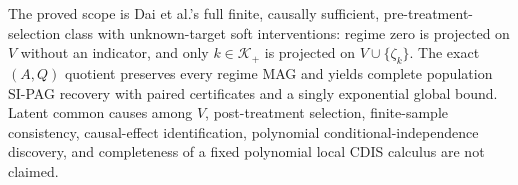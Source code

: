 The proved scope is Dai et al.'s full finite, causally sufficient, pre-treatment-selection class with unknown-target soft interventions: regime zero is projected on \(V\) without an indicator, and only \(k\in\mathcal K_+\) is projected on \(V\cup\{\zeta_k\}\).  The exact \((A,Q)\) quotient preserves every regime MAG and yields complete population SI-PAG recovery with paired certificates and a singly exponential global bound.  Latent common causes among \(V\), post-treatment selection, finite-sample consistency, causal-effect identification, polynomial conditional-independence discovery, and completeness of a fixed polynomial local CDIS calculus are not claimed.